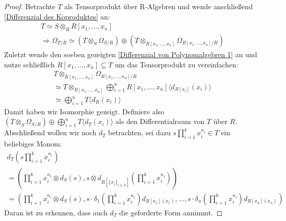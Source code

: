 \documentclass[10pt,a4paper]{report}
\newcommand{\divR}[2]{\Omega_{#1/#2}}
\newcommand{\divf}[1]{d_{#1}}
\newcommand{\Tensor}[3]{#1 \otimes_{#2} #3}
\newcommand{\tensor}[3]{#1 \otimes #3}
\newcommand{\Verz}[1]{\langle #1 \rangle}
\begin{document}
\begin{proof}
Betrachte $T$ als Tensorprodukt über R-Algebren und wende anschließend \cref{Differenzial des Koproduktes} an:
\begin{gather*}
T \simeq \Tensor{S}{R}{R[x_1,...,x_n]} \\
\Rightarrow \divR{T}{R} \simeq (\Tensor{T}{S}{\divR{S}{R}}) \oplus (\Tensor{T}{R[x_1,...,x_n]}{\divR{R[x_1,...,x_n]}{R}})
\end{gather*}
Zuletzt wende den soeben gezeigten \cref{Differenzial von Polynomalgebren 1} an und nutze schließlich $R[x_1,...,x_n] \subseteq T$ um das Tensorprodukt zu vereinfachen:
\begin{gather*}
\Tensor{T}{R[x_1,...,x_n]}{\divR{R[x_1,...,x_n]}{R}}\\
\simeq \Tensor{T}{R[x_1,...,x_n]}{\bigoplus_{i = 1}^n R[x_1,...,x_n]\langle \divf{R[x_i]}(x_i) \rangle } \\
\simeq \bigoplus_{i = 1}^n T \langle \divf{R}(x_i) \rangle
\end{gather*}
Damit haben wir Isomorphie gezeigt. Definiere also $(\Tensor{T}{S}{\divR{S}{R}}) \oplus \bigoplus_{i = 1}^n T \Verz{\divf{T}(x_i)}$ als den Differentialraum von $T$ über $R$.\\
Abschließend wollen wir noch $\divf{T}$ betrachten, sei dazu $s\prod_{i =1}^k x_i^{n_i} \in T$ ein beliebiges Monom:
\begin{gather*}
d_T\left(s\prod_{i =1}^k x_i^{n_i}\right) \\
= \left(\tensor{\prod_{i =1}^k x_i^{n_i}}{S}{\divf{S}(s)},
 \tensor{s}{R[\lbrace x_i \rbrace_{i \in \Lambda}]}{\divf{R[\lbrace x_i \rbrace_{i \in \Lambda}]}}\left(\prod_{i =1}^k x_i^{n_i}\right)\right)\\
=\left(\tensor{\prod_{i =1}^k x_i^{n_i}}{S}{\divf{S}(s)},
s \cdot \delta_1 \left( \prod_{i =1}^k x_i^{n_i} \right) \divf{R[x_1](x_1)} , \dots , s \cdot \delta_n \left( \prod_{i =1}^k x_i^{n_i} \right) \divf{R[x_n](x_n)} \right)
\end{gather*}
Daran ist zu erkennen, dass auch $\divf{T}$ die geforderte Form annimmt.
\end{proof}
\end{document}
